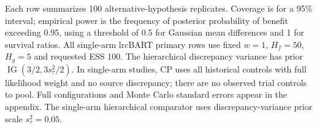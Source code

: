 \documentclass[11pt]{article}
\theoremstyle{remark}\newtheorem{remark}{Remark}[section]
\providecommand{\DIFaddtex}[1]{{\protect\color{blue} \sf #1}} %
\providecommand{\DIFadd}[1]{\texorpdfstring{\DIFaddtex{#1}}{#1}} %
\begin{document}
\noindent\begin{minipage}{\linewidth}\footnotesize \DIFadd{Each row summarizes 100 alternative-hypothesis replicates. Coverage is for a 95\% interval; empirical power is the frequency of posterior probability of benefit exceeding 0.95, using a threshold of 0.5 for Gaussian mean differences and 1 for survival ratios. All single-arm lrcBART primary rows use fixed $w=1$, $H_f=50$, $H_g=5$ and requested ESS 100. The hierarchical discrepancy variance has prior $\operatorname{IG}(3/2,3s_\tau^2/2)$. In single-arm studies, CP uses all historical controls with full likelihood weight and no source discrepancy; there are no observed trial controls to pool. Full configurations and Monte Carlo standard errors appear in the appendix. The single-arm hierarchical comparator uses discrepancy-variance prior scale $s_\tau^2=0.05$.}\end{minipage}
\endgroup
 \clearpage
\end{document}

